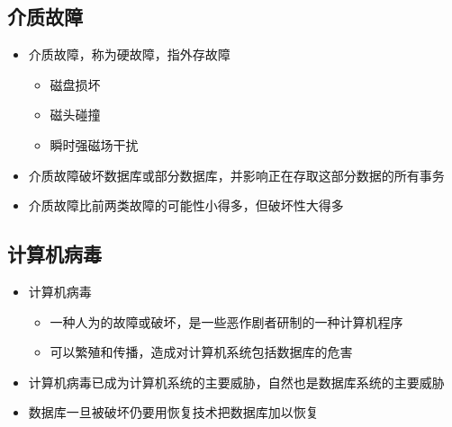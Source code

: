 \subsection{介质故障}
\begin{itemize}
    \item 介质故障，称为硬故障，指外存故障
    \vspace{-0.8em}
	\begin{multicols}{3}
        \begin{itemize}
            \item 磁盘损坏
            \item 磁头碰撞
            \item 瞬时强磁场干扰
        \end{itemize}
	\end{multicols}
	\vspace{-1em}
    \item 介质故障破坏数据库或部分数据库，并影响正在存取这部分数据的所有事务
    \item 介质故障比前两类故障的可能性小得多，但破坏性大得多
\end{itemize}

\subsection{计算机病毒}
\begin{itemize}
    \item 计算机病毒
    \begin{itemize}
        \item 一种人为的故障或破坏，是一些恶作剧者研制的一种计算机程序
        \item 可以繁殖和传播，造成对计算机系统包括数据库的危害
    \end{itemize}
    \item 计算机病毒已成为计算机系统的主要威胁，自然也是数据库系统的主要威胁
    \item 数据库一旦被破坏仍要用恢复技术把数据库加以恢复
\end{itemize}

